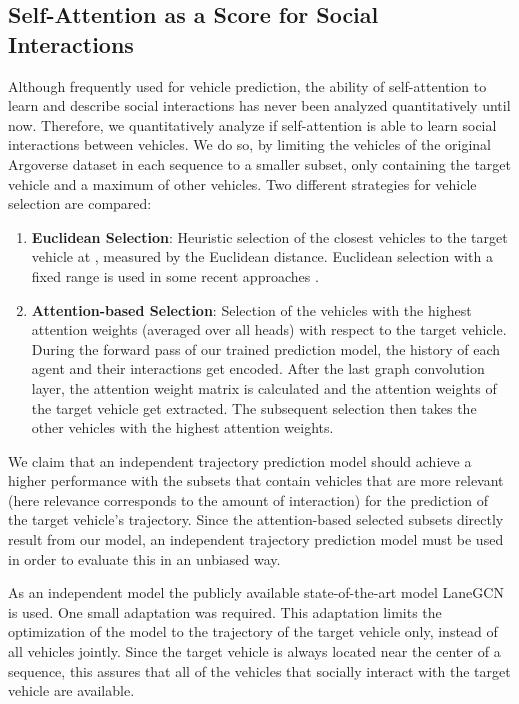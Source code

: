 \documentclass[letterpaper, 10 pt, conference]{ieeeconf}
\begin{document}
\subsection{Self-Attention as a Score for Social Interactions}
Although frequently used for vehicle prediction, the ability of self-attention to learn and describe social interactions has never been analyzed quantitatively until now.
Therefore, we quantitatively analyze if self-attention is able to learn social interactions between vehicles.
We do so, by limiting the vehicles of the original Argoverse dataset in each sequence to a smaller subset, only containing the target vehicle and a maximum of  other vehicles.
Two different strategies for vehicle selection are compared:
\begin{enumerate}
	\item \textbf{Euclidean Selection}: Heuristic selection of the  closest vehicles to the target vehicle at , measured by the Euclidean distance. Euclidean selection with a fixed range is used in some recent approaches \cite{Li2020a_ARXIV, Salzmann2020}.
	\item \textbf{Attention-based Selection}: Selection of the  vehicles with the highest attention weights (averaged over all heads) with respect to the target vehicle. During the forward pass of our trained prediction model, the history of each agent and their interactions get encoded. After the last graph convolution layer, the attention weight matrix is calculated and the attention weights of the target vehicle get extracted. The subsequent selection then takes the  other vehicles with the highest attention weights.
\end{enumerate}

We claim that an independent trajectory prediction model should achieve a higher performance with the subsets that contain vehicles that are more relevant (here relevance corresponds to the amount of interaction) for the prediction of the target vehicle's trajectory.
Since the attention-based selected subsets directly result from our model, an independent trajectory prediction model must be used in order to evaluate this in an unbiased way.

As an independent model the publicly available state-of-the-art model LaneGCN \cite{Liang2020} is used.
One small adaptation was required.
This adaptation limits the optimization of the model to the trajectory of the target vehicle only, instead of all vehicles jointly.
Since the target vehicle is always located near the center of a sequence, this assures that all of the vehicles that socially interact with the target vehicle are available.
\end{document}
